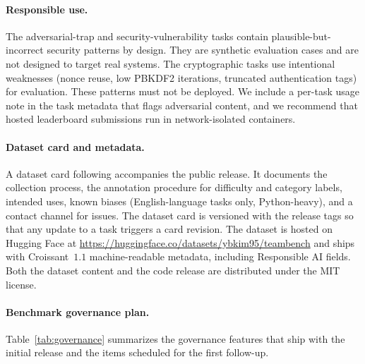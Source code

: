 \documentclass{article}
\begin{document}
\paragraph{Responsible use.}
The adversarial-trap and security-vulnerability tasks contain plausible-but-incorrect security patterns by design. They are synthetic evaluation cases and are not designed to target real systems. The cryptographic tasks use intentional weaknesses (nonce reuse, low PBKDF2 iterations, truncated authentication tags) for evaluation. These patterns must not be deployed. We include a per-task usage note in the task metadata that flags adversarial content, and we recommend that hosted leaderboard submissions run in network-isolated containers.

\paragraph{Dataset card and metadata.}
A dataset card following \citet{gebru2021datasheets} accompanies the public release. It documents the collection process, the annotation procedure for difficulty and category labels, intended uses, known biases (English-language tasks only, Python-heavy), and a contact channel for issues. The dataset card is versioned with the release tags so that any update to a task triggers a card revision. The dataset is hosted on Hugging Face at \url{https://huggingface.co/datasets/ybkim95/teambench} and ships with Croissant~$1.1$ machine-readable metadata, including Responsible AI fields. Both the dataset content and the code release are distributed under the MIT license.

\paragraph{Benchmark governance plan.}
Table~\ref{tab:governance} summarizes the governance features that ship with the initial release and the items scheduled for the first follow-up.
\end{document}
